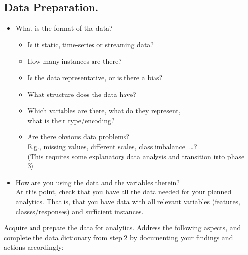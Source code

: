 \subsection{Data Preparation.}

\begin{itemize}
  \item What is the format of the data?
  \begin{itemize} 
    \item Is it static, time-series or streaming data?
    \item How many instances are there?
    \item Is the data representative, or is there a bias?
    \item What structure does the data have?
    \item Which variables are there, what do they represent, 
      \\ what is their type/encoding?
    \item Are there obvious data problems?
      \\ E.g., missing values, different scales, class imbalance, \dots?
      \\ (This requires some explanatory data analysis and transition into phase 3)
  \end{itemize}
  \item How are you using the data and the variables therein?
    \\ At this point, check that you have all the data needed for your planned analytics. That is, that you have data with all relevant variables (features, classes/responses) and sufficient instances.
\end{itemize}
Acquire and prepare the data for analytics. Address the following aspects, and complete the data dictionary from step 2 by documenting your findings and actions accordingly:
